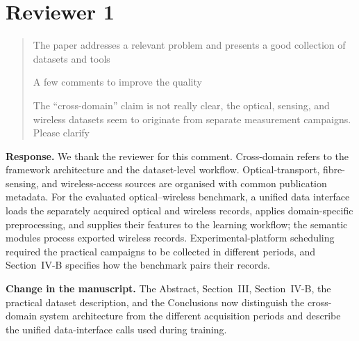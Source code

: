 \documentclass[11pt]{article}
\newenvironment{reviewercomment}{\begin{quote}\color{reviewblue}}{\end{quote}}
\newenvironment{authorresponse}{\color{responsegreen}\textbf{Response.} }{\par\color{black}}
\newcommand{\change}[1]{\par\textbf{Change in the manuscript.} #1\par}
\begin{document}
\section*{Reviewer 1}

\begin{reviewercomment}
The paper addresses a relevant problem and presents a good collection of datasets and tools

A few comments to improve the quality

\textbullet{} The ``cross-domain'' claim is not really clear, the optical, sensing, and wireless datasets seem to originate from separate measurement campaigns. Please clarify
\end{reviewercomment}
\begin{authorresponse}
We thank the reviewer for this comment. Cross-domain refers to the framework architecture and the dataset-level workflow. Optical-transport, fibre-sensing, and wireless-access sources are organised with common publication metadata. For the evaluated optical--wireless benchmark, a unified data interface loads the separately acquired optical and wireless records, applies domain-specific preprocessing, and supplies their features to the learning workflow; the semantic modules process exported wireless records. Experimental-platform scheduling required the practical campaigns to be collected in different periods, and Section~IV-B specifies how the benchmark pairs their records.
\end{authorresponse}
\change{The Abstract, Section~III, Section~IV-B, the practical dataset description, and the Conclusions now distinguish the cross-domain system architecture from the different acquisition periods and describe the unified data-interface calls used during training.}
\end{document}
